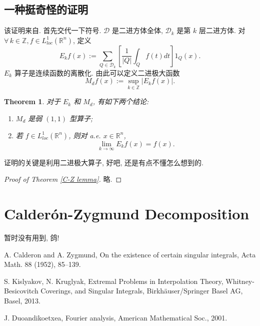 \documentclass[a4paper,11pt]{article}
\newtheorem{theorem}{Theorem}[section]
\theoremstyle{definition}
\begin{document}
\begin{CJK*}{UTF8}{gbsn}
\subsection{一种挺奇怪的证明}

该证明来自\cite[Theorem 2.11]{d01}.
首先交代一下符号. $ \mathcal{D} $ 是二进方体全体, $ \mathcal{D}_k $ 是第 $ k $ 层二进方体. 
对 $ \forall \, k \in \mathbb{Z}, f \in L^1_{loc}(\mathbb{R}^n) $, 定义
$$
    E_k f (x) := \sum_{Q \in \mathcal{D}_k} \left[ \frac{1}{|Q|} \int_{Q} f(t) dt \right] \mathrm{1}_Q (x).
$$
$ E_k $ 算子是连续函数的离散化. 由此可以定义二进极大函数
$$
    M_d f(x) := \sup_{k \in \mathbb{Z}} |E_k f (x)|.
$$

\begin{theorem} \label{thm} 
    对于 $ E_k $ 和 $ M_d $, 有如下两个结论:
    \begin{enumerate}[{\rm(i)}]
        \item $ M_d $ 是弱 $ (1, 1) $ 型算子;
        \item 若 $ f \in L^1_{loc}(\mathbb{R}^n) $, 则对 a.e. $ x \in \mathbb{R}^n $,
        $$
            \lim_{k \to \infty} E_k f (x) = f(x).
        $$
    \end{enumerate}
\end{theorem}

证明的关键是利用二进极大算子, 好吧, 还是有点不懂怎么想到的.

\begin{proof}[Proof of Theorem \ref{C-Z lemma}]
    略.
\end{proof}

\section{Calder\'on-Zygmund Decomposition}

暂时没有用到, 鸽!

\begin{thebibliography}{99}

     A. Calderon and A. Zygmund, On the existence of certain singular integrals, 
        Acta Math. 88 (1952), 85--139.
        
     S. Kislyakov, N. Kruglyak,
    Extremal Problems in Interpolation Theory, Whitney-Besicovitch Coverings, and Singular Integrals,
    Birkh\"{a}user/Springer Basel AG, Basel, 2013.
    
     J. Duoandikoetxea, Fourier analysis, American Mathematical Soc., 2001.
    
\end{thebibliography}

\end{CJK*}
\end{document}
